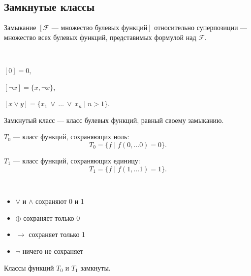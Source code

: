 \subsection{Замкнутые классы}

\begin{defn}
    Замыкание $[\mathcal{F} \mbox{ --- множество булевых функций}]$ относительно суперпозиции --- множество всех булевых функций, представимых формулой над $\mathcal{F}$.
\end{defn}

\begin{examples}~

    $[0] = 0$, 
    
    $[\neg x]  = \{x,\neg x\}$, 
    
    $[x \vee y] = \{x_1\ \vee\ \ldots\ \vee\ x_n \mid n > 1\}$.
\end{examples}

\begin{defn}
    Замкнутый класс --- класс булевых функций, равный своему замыканию.
\end{defn}

\begin{defn}
    $T_0$ --- класс функций, сохраняющих ноль:  
    \[ T_0 = \{f \mid f(0, \ldots 0) = 0\}. \] 
\end{defn}

\begin{defn}
    $T_1$ --- класс функций, сохраняющих единицу: 
    \[ T_1 = \{ f \mid f(1, \ldots 1) = 1\}. \] 
\end{defn}

\begin{examples}~
    \begin{itemize}
        \item $\vee$ и $\wedge$ сохраняют 0 и 1
        \item $\oplus$ сохраняет только 0
        \item $\to$ сохраняет только 1
        \item $\neg$ ничего не сохраняет
    \end{itemize}
\end{examples}

\begin{theorem-non}
        Классы функций $T_0$ и $T_1$ замкнуты.
\end{theorem-non}